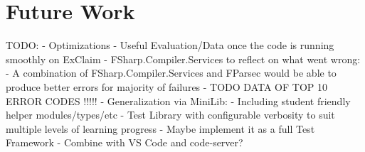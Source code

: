 \section{Future Work} %


\begin{justify}
TODO:
- Optimizations
- Useful Evaluation/Data once the code is running smoothly on ExClaim
- FSharp.Compiler.Services to reflect on what went wrong:
- A combination of FSharp.Compiler.Services and FParsec would be able to produce better errors for majority of failures
- TODO DATA OF TOP 10 ERROR CODES !!!!!
- Generalization via MiniLib:
- Including student friendly helper modules/types/etc
- Test Library with configurable verbosity to suit multiple levels of learning progress 
- Maybe implement it as a full Test Framework
- Combine with VS Code and code-server?
\end{justify}






